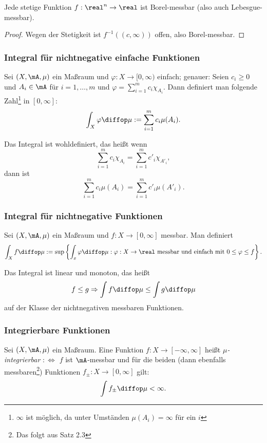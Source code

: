 \begin{rmrk}
 Jede stetige Funktion $f:\real^n \to \real$ ist Borel-messbar (also auch Lebesgue-messbar).
\end{rmrk}

\begin{proof}
 Wegen der Stetigkeit ist $f^{-1}((c,\infty))$ offen, also Borel-messbar.
\end{proof}

\subsubsection{Integral für nichtnegative einfache Funktionen}
Sei $(X,\mA,\mu)$ ein Maßraum und $\varphi: X \to [0, \infty)$ einfach; genauer: Seien $c_i \ge 0$ und $A_i \in \mA$ für $i=1,\ldots,m$ und $\varphi = \sum_{i=1}^m c_i \chi_{A_i}$. Dann definiert man folgende Zahl\footnote{{$\infty$ ist möglich, da unter Umständen $\mu(A_i) = \infty$ für ein $i$}} in $[0,\infty]$:
\[ \int_X \varphi \diffop \mu := \sum_{i=1}^m c_i \mu( A_i ). \]

\begin{rmrk}
 Das Integral ist wohldefiniert, das heißt wenn
 \[ \sum_{i=1}^m c_i \chi_{A_i} = \sum_{i=1}^m c'_i \chi_{A'_i}, \]
 dann ist 
 \[ \sum_{i=1}^m c_i \mu(A_i) = \sum_{i=1}^m c'_i \mu(A'_i). \]
\end{rmrk}

\subsubsection{Integral für nichtnegative Funktionen}
Sei $(X,\mA,\mu)$ ein Maßraum und $f: X \to [0, \infty]$ messbar. Man definiert
\[ \int_X f \diffop \mu := \sup \left\{ \int_x \varphi \diffop \mu : \varphi: X \to \real \text{ messbar und einfach mit } 0 \le \varphi \le f \right\}. \]

\begin{rmrk}
 Das Integral ist linear und monoton, das heißt
 \[ f \le g \Rightarrow \int f \diffop \mu \le \int g \diffop \mu \]
 auf der Klasse der nichtnegativen messbaren Funktionen.
\end{rmrk}

\subsubsection{Integrierbare Funktionen}
Sei $(X,\mA,\mu)$ ein Maßraum. Eine Funktion $f:X \to [-\infty,\infty]$ heißt \emph{$\mu$-integrierbar} $:\Leftrightarrow$ $f$ ist $\mA$-messbar und für die beiden (dann ebenfalls messbaren\footnote{Das folgt aus Satz 2.3}) Funktionen $f_\pm : X \to [0,\infty]$ gilt:
\[ \int f_\pm \diffop \mu < \infty. \]

